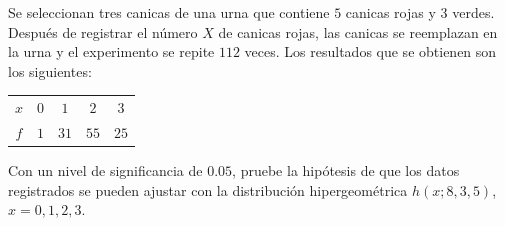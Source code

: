 \begin{enunciado}
 Se seleccionan tres canicas de una urna que contiene $5$ canicas rojas
 y $3$ verdes.
 Despu\'es de registrar el n\'umero $X$ de canicas rojas,
 las canicas se reemplazan en la urna y el experimento se repite $112$ veces.
 Los resultados que se obtienen son los siguientes:
 \begin{center}
  \begin{tabular}{c|cccc}
   $x$ & $0$ &  $1$ &  $2$ &  $3$ \\
   $f$ & $1$ & $31$ & $55$ & $25$
  \end{tabular}
 \end{center}
 Con un nivel de significancia de $0.05$, pruebe la hip\'otesis
 de que los datos registrados se pueden ajustar
 con la distribuci\'on hipergeom\'etrica $h(x;8,3,5)$, $x = 0,1,2,3$.
\end{enunciado}

